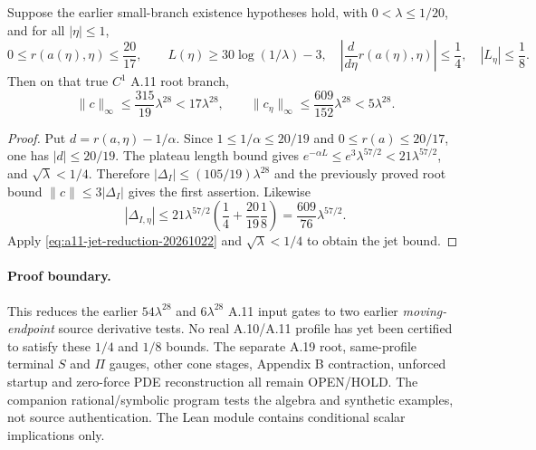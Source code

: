 \begin{theorem}
Suppose the earlier small-branch existence hypotheses hold, with
$0<\lambda\le1/20$, and for all $|\eta|\le1$,
\[
0\le r(a(\eta),\eta)\le\frac{20}{17},\qquad
L(\eta)\ge30\log(1/\lambda)-3,\quad
\left|\frac{d}{d\eta}r(a(\eta),\eta)\right|\le\frac14,\quad
|L_\eta|\le\frac18.
\]
Then on that true $C^1$ A.11 root branch,
\begin{equation}\label{eq:a11-new-jet-quantitative-20261022}
\boxed{\ 
\|c\|_\infty\le\frac{315}{19}\lambda^{28}<17\lambda^{28},
\qquad
\|c_\eta\|_\infty\le\frac{609}{152}\lambda^{28}<5\lambda^{28}.
\ }
\end{equation}
\end{theorem}
\begin{proof}
Put $d=r(a,\eta)-1/\alpha$. Since
$1\le1/\alpha\le20/19$ and $0\le r(a)\le20/17$,
one has $|d|\le20/19$. The plateau length bound gives
$e^{-\alpha L}\le e^3\lambda^{57/2}
<21\lambda^{57/2}$, and $\sqrt\lambda<1/4$.
Therefore
$|\Delta_I|\le (105/19)\lambda^{28}$ and the previously
proved root bound $\|c\|\le3|\Delta_I|$ gives the
first assertion. Likewise
\[
|\Delta_{I,\eta}|
\le21\lambda^{57/2}
\left(\frac14+\frac{20}{19}\frac18\right)
=\frac{609}{76}\lambda^{57/2}.
\]
Apply \eqref{eq:a11-jet-reduction-20261022} and
$\sqrt\lambda<1/4$ to obtain the jet bound.
\end{proof}

\paragraph{Proof boundary.}
This reduces the earlier $54\lambda^{28}$ and
$6\lambda^{28}$ A.11 input gates to two earlier
\emph{moving-endpoint} source derivative tests.
No real A.10/A.11 profile has yet been certified to satisfy
these $1/4$ and $1/8$ bounds. The separate A.19 root,
same-profile terminal $S$ and $\Pi$ gauges, other cone stages,
Appendix B contraction, unforced startup and zero-force PDE
reconstruction all remain OPEN/HOLD.
The companion rational/symbolic program tests the algebra
and synthetic examples, not source authentication.
The Lean module contains conditional scalar implications only.
